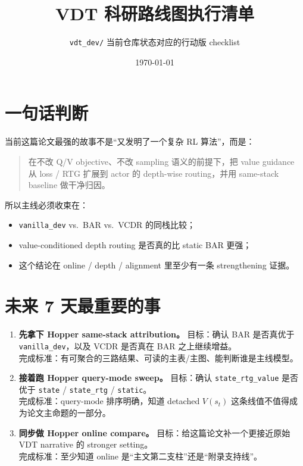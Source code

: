 \documentclass[11pt,UTF8,fontset=fandol]{ctexart}
\title{\textbf{VDT 科研路线图执行清单}}
\author{\texttt{vdt\_dev/} 当前仓库状态对应的行动版 checklist}
\date{\today}
\begin{document}
\maketitle

\section{一句话判断}

当前这篇论文最强的故事不是“又发明了一个复杂 RL 算法”，而是：

\begin{quote}
在不改 \vspace{0.2em}Q/V objective、不改 sampling 语义的前提下，把 value guidance 从 loss / RTG 扩展到 actor 的 depth-wise routing，并用 same-stack baseline 做干净归因。
\end{quote}

所以主线必须收束在：

\begin{itemize}
  \item \texttt{vanilla\_dev} vs.\ BAR vs.\ VCDR 的同栈比较；
  \item value-conditioned depth routing 是否真的比 static BAR 更强；
  \item 这个结论在 online / depth / alignment 里至少有一条 strengthening 证据。
\end{itemize}

\section{未来 7 天最重要的事}

\begin{enumerate}
  \item \textbf{先拿下 Hopper same-stack attribution。}
  目标：确认 BAR 是否真优于 \texttt{vanilla\_dev}，以及 VCDR 是否真在 BAR 之上继续增益。\\
  完成标准：有可聚合的三路结果、可读的主表/主图、能判断谁是主线模型。

  \item \textbf{接着跑 Hopper query-mode sweep。}
  目标：确认 \texttt{state\_rtg\_value} 是否优于 \texttt{state} / \texttt{state\_rtg} / \texttt{static}。\\
  完成标准：query-mode 排序明确，知道 detached \(V(s_t)\) 这条线值不值得成为论文主命题的一部分。

  \item \textbf{同步做 Hopper online compare。}
  目标：给这篇论文补一个更接近原始 VDT narrative 的 stronger setting。\\
  完成标准：至少知道 online 是“主文第二支柱”还是“附录支持线”。
\end{enumerate}
\end{document}
